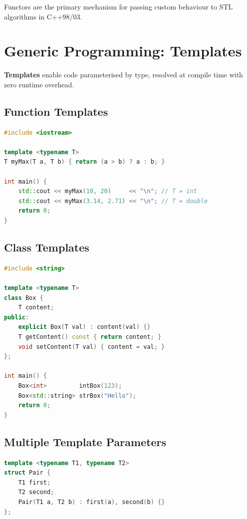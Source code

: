 Functors are the primary mechanism for passing custom behaviour to STL algorithms in C++98/03.

\section{Generic Programming: Templates}
\label{sec:templates}

\textbf{Templates} enable code parameterised by type, resolved at compile time with zero runtime overhead.

\subsection{Function Templates}

\begin{lstlisting}[language=C++, caption={Function template deducing type from arguments}]
#include <iostream>

template <typename T>
T myMax(T a, T b) { return (a > b) ? a : b; }

int main() {
    std::cout << myMax(10, 20)     << "\n"; // T = int
    std::cout << myMax(3.14, 2.71) << "\n"; // T = double
    return 0;
}
\end{lstlisting}

\subsection{Class Templates}

\begin{lstlisting}[language=C++, caption={Class template for a generic container}]
#include <string>

template <typename T>
class Box {
    T content;
public:
    explicit Box(T val) : content(val) {}
    T getContent() const { return content; }
    void setContent(T val) { content = val; }
};

int main() {
    Box<int>         intBox(123);
    Box<std::string> strBox("Hello");
    return 0;
}
\end{lstlisting}

\subsection{Multiple Template Parameters}

\begin{lstlisting}[language=C++, caption={Template with two type parameters}]
template <typename T1, typename T2>
struct Pair {
    T1 first;
    T2 second;
    Pair(T1 a, T2 b) : first(a), second(b) {}
};
\end{lstlisting}

